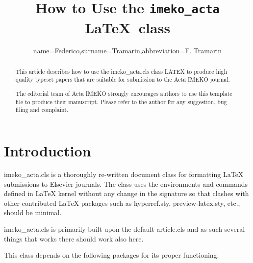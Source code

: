 \documentclass[10pt]{imeko_acta}
\def\file#1{\textsf{\fontsize{9.1}{9.5}\selectfont#1}\xspace}
\begin{document}
\title{How to Use the \texttt{imeko\_acta} \LaTeX\ class} %

\author[a1,a2]{name=Federico,surname=Tramarin,abbreviation=F. Tramarin}%



\Funding{}%

\begin{abstract}
	This article describes how to use the imeko\_acta.cls class LATEX to produce high quality typeset papers that are suitable for submission to the Acta IMEKO journal.
	
	The editorial team of Acta IMEKO strongly encourages 
	authors to use this \LaTeXe template file to produce their manuscript.
	Please refer to the author for any suggestion, bug filing and complaint.
\end{abstract}

\maketitle

\section{Introduction}

\file{imeko\_acta.cls} is a thoroughly re-written document class
for formatting \LaTeX{} submissions to Elsevier journals.
The class uses the environments and commands defined in \LaTeX{} kernel
without any change in the signature so that clashes with other
contributed \LaTeX{} packages such as \file{hyperref.sty},
\file{preview-latex.sty}, etc., should be minimal.

\file{imeko\_acta.cls} is primarily built upon the default
\file{article.cls} and as such several things that works there should work also here.  

This class depends on the following packages
for its proper functioning:
\end{document}
